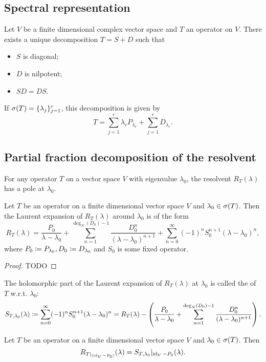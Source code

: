 \subsection{Spectral representation}
\begin{proposition}
Let $V$ be a finite dimensional complex vector space and $T$ an operator on $V$. There exists a unique decomposition $T = S + D$ such that
\begin{itemize}
\item $S$ is diagonal;
\item $D$ is nilpotent;
\item $SD = DS$.
\end{itemize}
If $\sigma(T) = \{\lambda_j\}_{j=1}^r$, this decomposition is given by
\[ T = \sum_{j=1}^r \lambda_r P_{\lambda_r} + \sum_{j=1}^r D_{\lambda_r}. \]
\end{proposition}

\subsection{Partial fraction decomposition of the resolvent}
For any operator $T$ on a vector space $V$ with eigenvalue $\lambda_0$, the resolvent $R_T(\lambda)$ has a pole at $\lambda_0$.

\begin{proposition}
Let $T$ be an operator on a finite dimensional vector space $V$ and $\lambda_0\in\sigma(T)$. Then the Laurent expansion of $R_T(\lambda)$ around $\lambda_0$ is of the form
\[ R_T(\lambda) = \frac{P_0}{\lambda-\lambda_0} + \sum_{n=1}^{\deg_N(D_0)-1}\frac{D_0^{n}}{(\lambda - \lambda_0)^{n+1}} + \sum_{n=0}^\infty(-1)^n S_0^{n+1}(\lambda - \lambda_0)^n, \]
where $P_0\coloneqq P_{\lambda_0}, D_0\coloneqq D_{\lambda_0}$ and $S_0$ is some fixed operator.
\end{proposition}
\begin{proof}
TODO
\end{proof}

\begin{definition}
The holomorphic part of the Laurent expansion of $R_T(\lambda)$ at $\lambda_0$ is called the  of $T$ w.r.t. $\lambda_0$:
\[ S_{T,\lambda_0}(\lambda) \coloneqq \sum_{n=0}^\infty(-1)^n S_0^{n+1}(\lambda - \lambda_0)^n = R_T(\lambda) - \left(\frac{P_0}{\lambda-\lambda_0} + \sum_{n=1}^{\deg_N(D_0)-1}\frac{D_0^{n}}{(\lambda - \lambda_0)^{n+1}}\right). \]
\end{definition}

\begin{proposition}
Let $T$ be an operator on a finite dimensional vector space $V$ and $\lambda_0\in\sigma(T)$. Then
\[ R_{T|_{(\operatorname{id}_V-P_0)}}(\lambda) = S_{T,\lambda_0}|_{\operatorname{id}_V-P_0}(\lambda). \]
\end{proposition}

